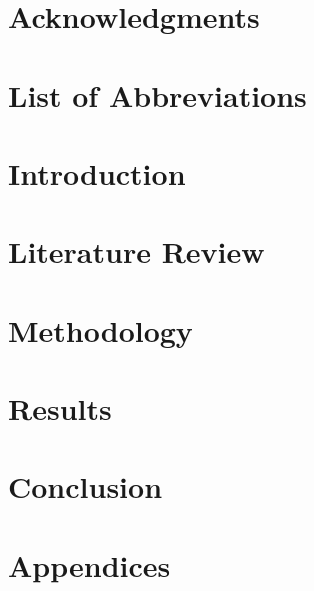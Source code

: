 \documentclass[edeposit,fullpage]{uiucthesis2018}
\begin{document}
\chapter*{Acknowledgments}



\tableofcontents
\listoftables
\listoffigures
{}

\chapter*{List of Abbreviations}


\pagebreak
\mainmatter

\chapter{Introduction}


\chapter{Literature Review}


\chapter{Methodology}
\label{sec:methods}


\chapter{Results}


\chapter{Conclusion}


\chapter{Appendices}


\backmatter
\nocite{*}


\end{document}
